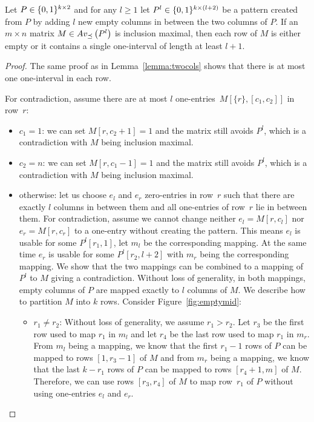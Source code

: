 \begin{lemma}
\label{lemma:maxmult}
Let $P\in\{0,1\}^{k\times2}$ and for any $l\geq1$ let $P^l\in\{0,1\}^{k\times(l+2)}$ be a pattern created from $P$ by adding $l$ new empty columns in between the two columns of $P$. If an $m\times n$ matrix $M\in Av_{\preceq}\left(P^l\right)$ is inclusion maximal, then each row of $M$ is either empty or it contains a single one-interval of length at least $l+1$.
\end{lemma}
\begin{proof}
The same proof as in Lemma~\ref{lemma:twocols} shows that there is at most one one-interval in each row.

For contradiction, assume there are at most $l$ one-entries~$M[\{r\},[c_1,c_2]]$ in row~$r$:
\begin{itemize}
	\item $c_1=1$: we can set $M[r,c_2+1]=1$ and the matrix still avoids $P^l$, which is a contradiction with $M$ being inclusion maximal.
	\item $c_2=n$: we can set $M[r,c_1-1]=1$ and the matrix still avoids $P^l$, which is a contradiction with $M$ being inclusion maximal.
	\item otherwise: let us choose $e_l$ and $e_r$ zero-entries in row~$r$ such that there are exactly $l$ columns in between them and all one-entries of row~$r$ lie in between them. For contradiction, assume we cannot change neither $e_l=M[r,c_l]$ nor $e_r=M[r,c_r]$ to a one-entry without creating the pattern. This means $e_l$ is usable for some $P^l[r_1,1]$, let $m_l$ be the corresponding mapping. At the same time $e_r$ is usable for some $P^l[r_2,l+2]$ with $m_r$ being the corresponding mapping. We show that the two mappings can be combined to a mapping of $P^l$ to $M$ giving a contradiction. Without loss of generality, in both mappings, empty columns of $P$ are mapped exactly to $l$ columns of $M$. We describe how to partition $M$ into $k$ rows. Consider Figure~\ref{fig:emptymid}:
	\begin{itemize}
		\item $r_1\neq r_2$: Without loss of generality, we assume $r_1>r_2$. Let $r_3$ be the first row used to map $r_1$ in $m_l$ and let $r_4$ be the last row used to map $r_1$ in $m_r$. From $m_l$ being a mapping, we know that the first $r_1-1$ rows of $P$ can be mapped to rows $[1,r_3-1]$ of $M$ and from $m_r$ being a mapping, we know that the last $k-r_1$ rows of $P$ can be mapped to rows $[r_4+1,m]$ of $M$. Therefore, we can use rows $[r_3,r_4]$ of $M$ to map row~$r_1$ of $P$ without using one-entries $e_l$ and $e_r$.

\end{itemize}
\end{itemize}
\end{proof}
